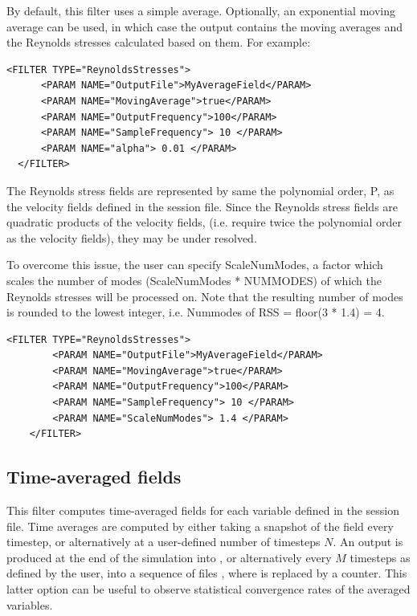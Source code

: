 By default, this filter uses a simple average. Optionally, an exponential
moving average can be used, in which case the output contains the moving
averages and the Reynolds stresses calculated based on them. For example:

\begin{lstlisting}[style=XMLStyle,gobble=2]
  <FILTER TYPE="ReynoldsStresses">
      <PARAM NAME="OutputFile">MyAverageField</PARAM>
      <PARAM NAME="MovingAverage">true</PARAM>
      <PARAM NAME="OutputFrequency">100</PARAM>
      <PARAM NAME="SampleFrequency"> 10 </PARAM>
      <PARAM NAME="alpha"> 0.01 </PARAM>
  </FILTER>
\end{lstlisting}

The Reynolds stress fields are represented by same the 
polynomial order, P, as the velocity fields defined in the session file.
Since the Reynolds stress fields are quadratic products of the velocity fields, 
(i.e. require twice the polynomial order as the velocity fields), they may be 
under resolved.

To overcome this issue, the user can specify ScaleNumModes, a factor which scales
the number of modes (ScaleNumModes * NUMMODES) of which the Reynolds stresses will
be processed on.
Note that the resulting number of modes is rounded to the lowest integer,
i.e. Nummodes of RSS = floor(3 * 1.4) = 4.

\begin{lstlisting}[style=XMLStyle,gobble=2]
    <FILTER TYPE="ReynoldsStresses">
        <PARAM NAME="OutputFile">MyAverageField</PARAM>
        <PARAM NAME="MovingAverage">true</PARAM>
        <PARAM NAME="OutputFrequency">100</PARAM>
        <PARAM NAME="SampleFrequency"> 10 </PARAM>
        <PARAM NAME="ScaleNumModes"> 1.4 </PARAM>
    </FILTER>
\end{lstlisting}


\subsection{Time-averaged fields}\label{filters:TimeAveragedFields}

This filter computes time-averaged fields for each variable defined in the
session file. Time averages are computed by either taking a snapshot of the
field every timestep, or alternatively at a user-defined number of timesteps
$N$. An output is produced at the end of the simulation into
, or alternatively every $M$ timesteps as defined by the
user, into a sequence of files , where \inltt{*} is
replaced by a counter. This latter option can be useful to observe statistical
convergence rates of the averaged variables.

